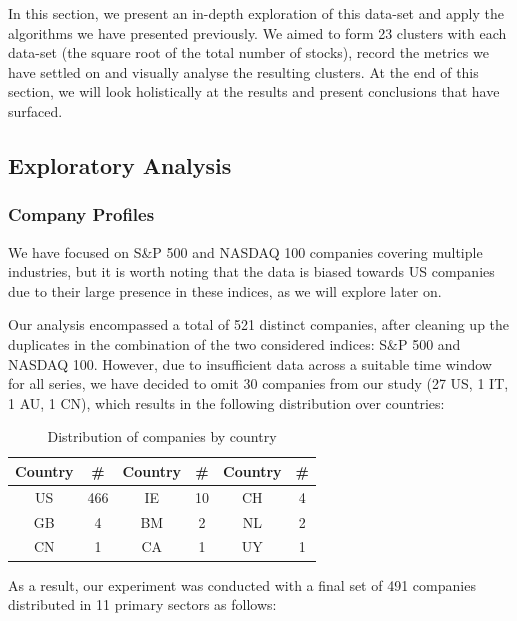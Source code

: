 \documentclass[11pt]{article}
\begin{document}
In this section, we present an in-depth exploration of this data-set and apply the algorithms we have presented previously. We aimed to form 23 clusters with each data-set (the square root of the total number of stocks), record the metrics we have settled on and visually analyse the resulting clusters. At the end of this section, we will look holistically at the results and present conclusions that have surfaced.

\subsection{Exploratory Analysis}

\subsubsection{Company Profiles}

We have focused on S\&P 500 and NASDAQ 100 companies covering multiple industries, but it is worth noting that the data is biased towards US companies due to their large presence in these indices, as we will explore later on.

Our analysis encompassed a total of 521 distinct companies, after cleaning up the duplicates in the combination of the two considered indices: S\&P 500 and NASDAQ 100. However, due to insufficient data across a suitable time window for all series, we have decided to omit 30 companies from our study (27 US, 1 IT, 1 AU, 1 CN), which results in the following distribution over countries: 

\begin{table}[H]
\centering
\begin{tabular}{|c|c|c|c|c|c|}
\hline
\textbf{Country} & \textbf{\#} & \textbf{Country} & \textbf{\#} & \textbf{Country} & \textbf{\#} \\
\hline
US & 466 & IE & 10 & CH & 4 \\
GB & 4 & BM & 2 & NL & 2 \\
CN & 1 & CA & 1 & UY & 1 \\
\hline
\end{tabular}
\caption{Distribution of companies by country}
\label{tab:my_label}
\end{table}


As a result, our experiment was conducted with a final set of 491 companies distributed in 11 primary sectors as follows:
\end{document}
